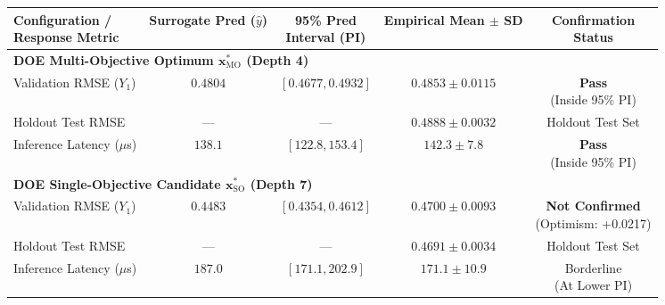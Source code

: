 \begin{tabular}{lcccc}
\toprule
\makecell[l]{\textbf{Configuration /}\\\textbf{Response Metric}} & \makecell{\textbf{Surrogate}\\\textbf{Pred ($\hat{y}$)}} & \makecell{\textbf{95\% Pred}\\\textbf{Interval (PI)}} & \makecell{\textbf{Empirical}\\\textbf{Mean $\pm$ SD}} & \makecell{\textbf{Confirmation}\\\textbf{Status}} \\
\midrule
\multicolumn{5}{l}{\textbf{DOE Multi-Objective Optimum $\mathbf{x}^*_{\text{MO}}$ (Depth 4)}} \\
Validation RMSE ($Y_1$) & $0.4804$ & $[0.4677, 0.4932]$ & $0.4853 \pm 0.0115$ & \makecell[c]{\textbf{Pass}\\(Inside 95\% PI)} \\
Holdout Test RMSE & --- & --- & $0.4888 \pm 0.0032$ & Holdout Test Set \\
Inference Latency ($\mu$s) & $138.1$ & $[122.8, 153.4]$ & $142.3 \pm 7.8$ & \makecell[c]{\textbf{Pass}\\(Inside 95\% PI)} \\
\midrule
\multicolumn{5}{l}{\textbf{DOE Single-Objective Candidate $\mathbf{x}^*_{\text{SO}}$ (Depth 7)}} \\
Validation RMSE ($Y_1$) & $0.4483$ & $[0.4354, 0.4612]$ & $0.4700 \pm 0.0093$ & \makecell[c]{\textbf{Not Confirmed}\\(Optimism: +0.0217)} \\
Holdout Test RMSE & --- & --- & $0.4691 \pm 0.0034$ & Holdout Test Set \\
Inference Latency ($\mu$s) & $187.0$ & $[171.1, 202.9]$ & $171.1 \pm 10.9$ & \makecell[c]{Borderline\\(At Lower PI)} \\
\bottomrule
\end{tabular}
